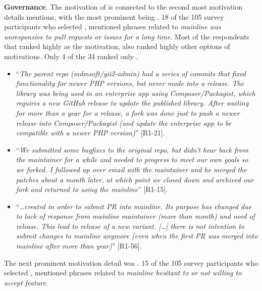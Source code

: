 \nd \textbf{Governance}. The motivation of  is connected to the second most motivation details mentions, with the most prominent being . 18 of the 105 survey participants who selected , mentioned phrases related to \emph{mainline was unresponsive to pull requests or issues for a long time}. Most of the respondents that ranked highly  as the motivation, also ranked highly other options of motivations. Only 4 of the 34 ranked only . 

\begin{itemize}[leftmargin=*]
\item ``\emph{The parent repo (mdmsoft/yii2-admin) had a series of commits that fixed functionality for newer PHP versions, but never made into a release. The library was being used in an enterprise app using Composer/Packagist, which requires a new GitHub release to update the published library. After waiting for more than a year for a release, a fork was done just to push a newer release into Composer/Packagist (and update the enterprise app to be compatible with a newer PHP version)}'' [R1-21].

\item ``\emph{We submitted some bugfixes to the original repo, but didn't hear back from the maintainer for a while and needed to progress to meet our own goals so we forked. I followed up over email with the maintainer and he merged the patches about a month later, at which point we closed down and archived our fork and returned to using the mainline}'' [R1-15].

\item ``\emph{\ldots created in order to submit PR into mainline. Its purpose has changed due to lack of response from mainline maintainer (more than month) and need of release. This lead to release of a new variant. [\ldots] there is not intention to submit changes to mainline anymore (even when the first PR was merged into mainline after more than year)}'' [R1-56].
\end{itemize}

\nd The next prominent  motivation detail was .
15 of the 105 survey participants who selected , mentioned phrases related to \emph{mainline hesitant to or not willing to accept feature}.

